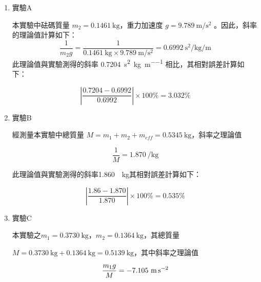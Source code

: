 \documentclass[11pt,a4paper]{article}
\theoremstyle{definition}
\begin{document}
            \begin{enumerate}
                \item 實驗A
                \par 本實驗中砝碼質量 $m_2 = \SI{0.1461}{\kilogram}$，重力加速度 $g = \SI{9.789}{\meter\per\second\squared}$ \cite{nlsc:twd97}。因此，斜率的理論值計算如下：
                \begin{equation}
                    \frac{1}{m_2 g} = \frac{1}{\SI{0.1461}{\kilogram} \times \SI{9.789}{\meter\per\second\squared}} = \SI{0.6992}{\second\squared\per\kilogram\per\meter}
                \end{equation}
                此理論值與實驗測得的斜率 \SI{0.7204}{\second\squared\per\kilogram\per\meter} 相比，其相對誤差計算如下：

                \begin{equation}
                    \left| \frac{0.7204 - 0.6992}{0.6992} \right| \times 100\% = 3.032\%
                \end{equation}

                \item 實驗B
                \par 經測量本實驗中總質量 $M = m_1 + m_2 + m_{eff} = \SI{0.5345}{\kilogram}$，斜率之理論值

                \begin{equation}
                    \frac{1}{M} = \SI{1.870}{\per\kilogram}
                \end{equation}

                此理論值與實驗測得的斜率\SI{1.860}{\per\kilogram}其相對誤差計算如下：

                \begin{equation}
                    \left| \frac{1.86 - 1.870}{1.870} \right| \times 100\% = 0.535\%
                \end{equation}

                \item 實驗C
                \par 本實驗之$m_1 = \SI{0.3730}{\kilogram}$，$m_2 = \SI{0.1364}{\kilogram}$，其總質量\par$M = \SI{0.3730}{\kilogram} + \SI{0.1364}{\kilogram} = \SI{0.5139}{\kilogram}$，其中斜率之理論值

                \begin{equation}
                    \- \frac{m_1g}{M} = \SI{-7.105}{\meter\per\second\squared} 
                \end{equation}


\end{enumerate}
\end{document}
